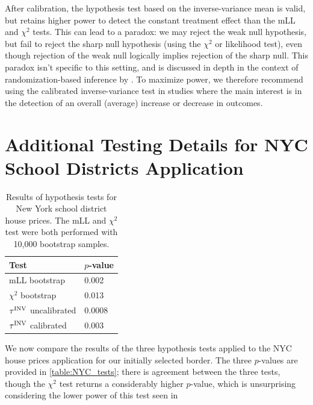     After calibration, the hypothesis test based on the inverse-variance mean is valid, but retains higher power to detect the constant treatment effect than the mLL and \(\chi^2\) tests.
This can lead to a paradox: we may reject the weak null hypothesis, but fail to reject the sharp null hypothesis (using the \(\chi^2\) or likelihood test), even though rejection of the weak null logically implies rejection of the sharp null.
This paradox isn't specific to this setting, and is discussed in depth in the context of randomization-based inference by \cite{Ding:2014sf}.
To maximize power, we therefore recommend using the calibrated inverse-variance test in studies where the main interest is in the detection of an overall (average) increase or decrease in outcomes.

\section{Additional Testing Details for NYC School Districts Application}
\label{sec:nyc_hypothesis_tests}

\begin{table}[tbp]
    \centering
    \bgroup
    \def\arraystretch{1.1}%
    \begin{tabular}{ll}
        \hline
        Test                   & \(p\)-value \\
        \hline
        mLL bootstrap            & 0.002 \\
        \(\chi^2\) bootstrap     & 0.013 \\
        \(\tau^{\mathrm{INV}}\) uncalibrated & 0.0008 \\
        \(\tau^{\mathrm{INV}}\) calibrated   & 0.003 \\
        \hline
    \end{tabular}
    \egroup
    \caption{
        Results of hypothesis tests for New York school district house prices.
        The mLL and \(\chi^2\) test were both performed with 10,000 bootstrap samples.
        \label{table:NYC_tests}
    }
\end{table}

We now compare the results of the three hypothesis tests applied to the NYC house prices application for our initially selected border.
The three \(p\)-values are provided in \autoref{table:NYC_tests}; there is agreement between the three tests, though the \(\chi^2\) test returns a considerably higher \(p\)-value, which is unsurprising considering the lower power of this test seen in 

